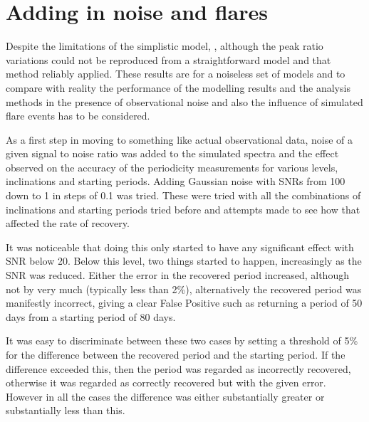 
\section{Adding in noise and flares}
\protect\label{section:addflares}

Despite the limitations of the simplistic model, , although the peak ratio variations could not be reproduced from a
straightforward model and that method reliably applied.  These results are for a noiseless set of models and to compare
with reality the performance of the modelling results and the analysis methods in the presence of observational noise
and also the influence of simulated flare events has to be considered.

As a first step in moving to something like actual observational data, noise of a given signal to noise ratio was added
to the simulated spectra and the effect observed on the accuracy of the periodicity measurements for various levels,
inclinations and starting periods. Adding Gaussian noise with SNRs from 100 down to 1 in steps of 0.1 was tried.
These were tried with all the combinations of inclinations and starting periods tried before and attempts made to see
how that affected the rate of recovery.

It was noticeable that doing this only started to have any significant effect with SNR below 20. Below this level, two
things started to happen, increasingly as the SNR was reduced. Either the error in the recovered period increased,
although not by very much (typically less than 2\%), alternatively the recovered period was manifestly incorrect, giving
a clear False Positive such as returning a period of 50 days from a starting period of 80 days.

It was easy to discriminate between these two cases by setting a threshold of 5\% for the difference between the
recovered period and the starting period. If the difference exceeded this, then the period was regarded as incorrectly
recovered, otherwise it was regarded as correctly recovered but with the given error. However in all the cases the
difference was either substantially greater or substantially less than this.

